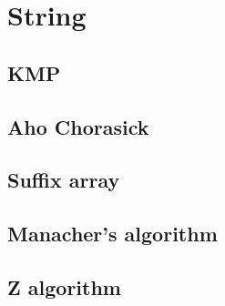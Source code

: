 \documentclass[10pt,landscape,a4paper,twocolumn]{article}
\begin{document}
\section{String}
\subsection{KMP}


\subsection{Aho Chorasick}


\subsection{Suffix array}


\subsection{Manacher's algorithm}


\subsection{Z algorithm}


\newpage
\end{document}
